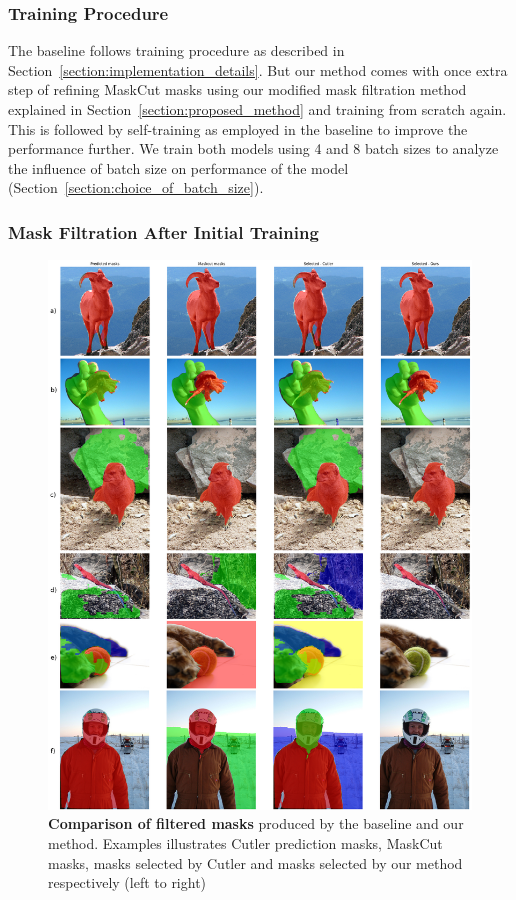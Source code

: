 \subsubsection{Training Procedure}
The baseline follows training procedure as described in Section~\ref{section:implementation_details}. But our method comes with once extra step of refining MaskCut masks using our modified mask filtration method explained in Section~\ref{section:proposed_method} and training from scratch again. This is followed by self-training as employed in the baseline to improve the performance further. We train both models using 4 and 8 batch sizes to analyze the influence of batch size on performance of the model (Section~\ref{section:choice_of_batch_size}). 

\subsubsection{Mask Filtration After Initial Training}
\begin{figure}
	\centering
	\includegraphics[width=1\textwidth]{Images/main/filtered_mask_comparison.png}
	\caption[\textbf{Mask Filtration Outputs - Baseline vs Ours}]{\textbf{Comparison of filtered masks} produced by the baseline and our method. Examples illustrates Cutler prediction masks, MaskCut masks, masks selected by Cutler and masks selected by our method respectively (left to right)}
	\label{fig:filtered_mask_comparison}
\end{figure}


